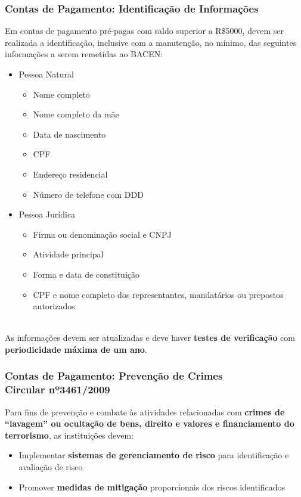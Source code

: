 \documentclass[10pt]{beamer}
\begin{document}
\begin{frame} 
\frametitle{Contas de Pagamento: Identificação de Informações}

Em contas de pagamento pré-pagas com saldo superior a R\$5000, devem ser realizada a identificação, inclusive com a manutenção, no mínimo, das seguintes informações a serem remetidas ao BACEN:
\\
\begin{itemize}
	\item Pessoa Natural 
	\begin{multicols}{2}
	\begin{itemize}
		\item Nome completo 
		\item Nome completo da mãe
		\item Data de nascimento
		\item CPF 
		\item Endereço residencial
		\item Número de telefone com DDD
	\end{itemize}
 	\end{multicols}
	\item Pessoa Jurídica 
	\begin{multicols}{2}
	\begin{itemize}
		\item Firma ou denominação social e CNPJ
		\item Atividade principal
		\item Forma e data de constituição
		\item CPF e nome completo dos representantes, mandatários ou prepostos autorizados 
	\end{itemize}
	\end{multicols}
\end{itemize}
\\
As informações devem ser atualizadas e deve haver \textbf{testes de verificação} com \textbf{periodicidade máxima de um ano}.

\end{frame}

\begin{frame} 
\frametitle{Contas de Pagamento: Prevenção de Crimes\\Circular nº3461/2009}

Para fins de prevenção e combate às atividades relacionadas com \textbf{crimes de “lavagem” ou ocultação de bens, direito e valores e financiamento do terrorismo}, as instituições devem: 
\begin{itemize}
\item Implementar \textbf{sistemas de gerenciamento de risco} para identificação e avaliação de risco
\item Promover \textbf{medidas de mitigação} proporcionais dos riscos identificados
\end{itemize}

\end{frame}
\end{document}
